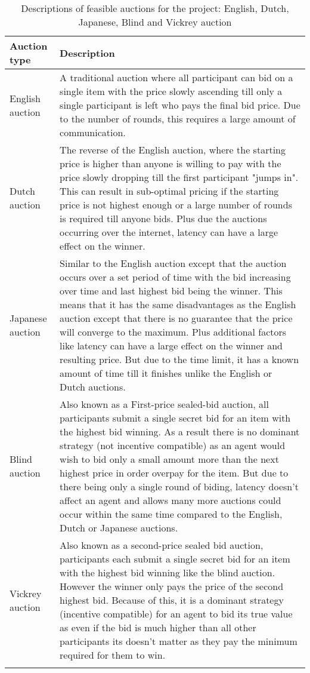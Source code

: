\begin{longtable}{|p{3cm}|p{10cm}|} \hline
    \textbf{Auction type} & \textbf{Description} \\ \hline
    English auction & A traditional auction where all participant can bid on a single item with the price slowly
        ascending till only a single participant is left who pays the final bid price. Due to the number of rounds,
        this requires a large amount of communication. \\ \hline

    Dutch auction & The reverse of the English auction, where the starting price is higher than anyone is willing to
        pay with the price slowly dropping till the first participant "jumps in". This can result in sub-optimal pricing
        if the starting price is not highest enough or a large number of rounds is required till anyone bids. Plus due
        the auctions occurring over the internet, latency can have a large effect on the winner. \\ \hline

    Japanese auction & Similar to the English auction except that the auction occurs over a set period of time with the
        bid increasing over time and last highest bid being the winner. This means that it has the same disadvantages
        as the English auction except that there is no guarantee that the price will converge to the maximum. Plus
        additional factors like latency can have a large effect on the winner and resulting price. But due to the time
        limit, it has a known amount of time till it finishes unlike the English or Dutch auctions. \\ \hline

    Blind auction & Also known as a First-price sealed-bid auction, all participants submit a single secret bid for an
        item with the highest bid winning. As a result there is no dominant strategy (not incentive compatible) as an
        agent would wish to bid only a small amount more than the next highest price in order overpay for the item.
        But due to there being only a single round of biding, latency doesn't affect an agent and allows many
        more auctions could occur within the same time compared to the English, Dutch or Japanese auctions. \\ \hline

    Vickrey auction~\citep{vickrey} & Also known as a second-price sealed bid auction, participants each submit
        a single secret bid for an item with the highest bid winning like the blind auction. However the winner only
        pays the price of the second highest bid. Because of this, it is a dominant strategy (incentive compatible)
        for an agent to bid its true value as even if the bid is much higher than all other participants its doesn't
        matter as they pay the minimum required for them to win. \\ \hline
    \caption{Descriptions of feasible auctions for the project: English, Dutch, Japanese, Blind and Vickrey auction}
    \label{tab:auctions_descriptions}
\end{longtable}

